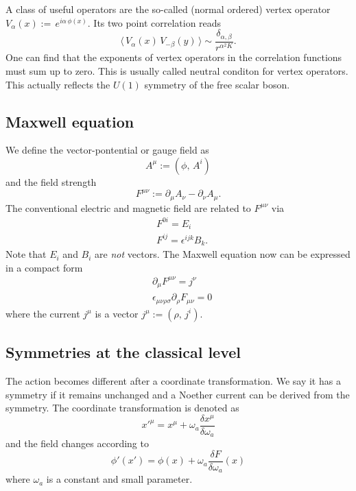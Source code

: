 \documentclass[submission, PhysLectNotes]{SciPost}
\begin{document}
A class of useful operators are the so-called (normal ordered) vertex operator $V_{\alpha}(x) :=\, e^{i\alpha\,\phi(x)}$. Its two point correlation reads
\begin{equation}
	\langle\, V_\alpha(x)\, V_{-\beta}(y)\, \rangle \sim \frac{\delta_{\alpha,\beta}}{r^{\alpha^2 K}}.
\end{equation}
One can find that the exponents of vertex operators in the correlation functions must sum up to zero. This is usually called neutral conditon for vertex operators. This actually reflects the $U(1)$ symmetry of the free scalar boson. 


\subsection{Maxwell equation}
We define the vector-pontential or gauge field as 
\begin{equation}
	A^\mu := (\phi,\, A^i)
\end{equation}
and the field strength
\begin{equation}
	F^{\mu\nu} := \partial_\mu A_\nu - \partial_\nu A_\mu.
\end{equation}
The conventional electric and magnetic field are related to $F^{\mu\nu}$ via
\begin{equation}
	\begin{aligned}
		&F^{0i} = E_i \\
		&F^{ij} = \epsilon^{ijk} B_k.
	\end{aligned}
\end{equation}
Note that $E_i$ and $B_i$ are {\it not} vectors. The Maxwell equation now can be expressed in a compact form 
\begin{equation}
	\begin{aligned}
		&\partial_\mu F^{\mu\nu} = j^\nu \\
		&\epsilon_{\mu\nu\rho\sigma}\partial_\rho F_{\mu\nu} =0 
	\end{aligned}
\end{equation}
where the current $j^\mu$ is a vector $j^\mu := (\rho,\,j^i)$.


\subsection{Symmetries at the classical level}
The action becomes different after a coordinate transformation. We say it has a symmetry if it remains unchanged and a Noether current can be derived from the symmetry. The coordinate transformation is denoted as
\begin{equation}
    x'^\mu = x^\mu + \omega_a \frac{\delta x^\mu}{\delta \omega_a}
\end{equation}
and the field changes according to
\begin{equation}
    \phi'(x') = \phi(x) + \omega_a \frac{\delta F}{\delta \omega_a}(x)
\end{equation}
where $\omega_a$ is a constant and small parameter.
\end{document}
